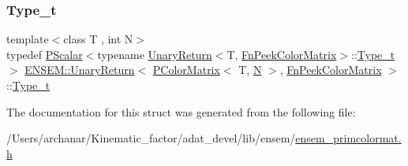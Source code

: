 \mbox{\label{structENSEM_1_1UnaryReturn_3_01PColorMatrix_3_01T_00_01N_01_4_00_01FnPeekColorMatrix_01_4_ab57f89c629e14031c8ea8f4215b52543}} 
\subsubsection{\texorpdfstring{Type\_t}{Type\_t}\hspace{0.1cm}{\footnotesize\ttfamily [2/2]}}
{\footnotesize\ttfamily template$<$class T , int N$>$ \\
typedef \mbox{\hyperlink{classENSEM_1_1PScalar}{P\+Scalar}}$<$typename \mbox{\hyperlink{structENSEM_1_1UnaryReturn}{Unary\+Return}}$<$T, \mbox{\hyperlink{structENSEM_1_1FnPeekColorMatrix}{Fn\+Peek\+Color\+Matrix}}$>$\+::\mbox{\hyperlink{structENSEM_1_1UnaryReturn_3_01PColorMatrix_3_01T_00_01N_01_4_00_01FnPeekColorMatrix_01_4_ab57f89c629e14031c8ea8f4215b52543}{Type\+\_\+t}}$>$ \mbox{\hyperlink{structENSEM_1_1UnaryReturn}{E\+N\+S\+E\+M\+::\+Unary\+Return}}$<$ \mbox{\hyperlink{classENSEM_1_1PColorMatrix}{P\+Color\+Matrix}}$<$ T, \mbox{\hyperlink{operator__name__util_8cc_a7722c8ecbb62d99aee7ce68b1752f337}{N}} $>$, \mbox{\hyperlink{structENSEM_1_1FnPeekColorMatrix}{Fn\+Peek\+Color\+Matrix}} $>$\+::\mbox{\hyperlink{structENSEM_1_1UnaryReturn_3_01PColorMatrix_3_01T_00_01N_01_4_00_01FnPeekColorMatrix_01_4_ab57f89c629e14031c8ea8f4215b52543}{Type\+\_\+t}}}



The documentation for this struct was generated from the following file\+:\begin{DoxyCompactItemize}
\item 
/\+Users/archanar/\+Kinematic\+\_\+factor/adat\+\_\+devel/lib/ensem/\mbox{\hyperlink{lib_2ensem_2ensem__primcolormat_8h}{ensem\+\_\+primcolormat.\+h}}\end{DoxyCompactItemize}
